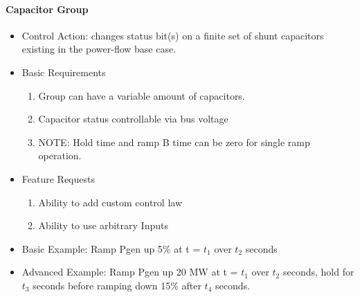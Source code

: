 \documentclass[12pt]{article}
\begin{document}
\paragraph{Capacitor Group}
\begin{itemize}
	\item Control Action: changes status bit(s) on a finite set of shunt capacitors existing in the power-flow base case.
	\item Basic Requirements
	\begin{enumerate}
		\item Group can have a variable amount of capacitors.
		\item Capacitor status controllable via bus voltage 
		\item NOTE: Hold time and ramp B time can be zero for single ramp operation.
	\end{enumerate}
	\item Feature Requests
	\begin{enumerate}
		\item Ability to add custom control law
		\item Ability to use arbitrary Inputs
	\end{enumerate}
	\item Basic Example: Ramp Pgen up 5\% at t = $t_1$ over $t_2$ seconds
	\item Advanced Example: Ramp Pgen up 20 MW at t = $t_1$ over $t_2$ seconds, hold for $t_3$ seconds before ramping down 15\% after $t_4$ seconds.
\end{itemize}

\pagebreak
\begin{multicols}{2}


\vfill\null
\columnbreak

\end{multicols}
\end{document}
